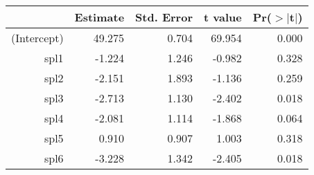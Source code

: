 \begin{table}[ht]
\centering
\begin{tabular}{rrrrr}
  \hline
 & Estimate & Std. Error & t value & Pr($>$$|$t$|$) \\ 
  \hline
(Intercept) & 49.275 & 0.704 & 69.954 & 0.000 \\ 
  spl1 & -1.224 & 1.246 & -0.982 & 0.328 \\ 
  spl2 & -2.151 & 1.893 & -1.136 & 0.259 \\ 
  spl3 & -2.713 & 1.130 & -2.402 & 0.018 \\ 
  spl4 & -2.081 & 1.114 & -1.868 & 0.064 \\ 
  spl5 & 0.910 & 0.907 & 1.003 & 0.318 \\ 
  spl6 & -3.228 & 1.342 & -2.405 & 0.018 \\ 
   \hline
\end{tabular}
\end{table}
